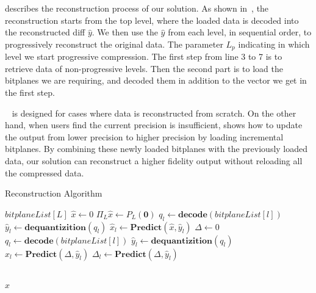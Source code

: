  describes the reconstruction process of our solution. 
As shown in~, the reconstruction starts from the top level, where the loaded data is decoded into the reconstructed diff $\hat{y}$.
We then use the $\hat{y}$ from each level, in sequential order, to progressively reconstruct the original data. 
The parameter $L_p$ indicating in which level we start progressive compression. The first step from line 3 to 7 is to retrieve data of non-progressive levels. Then the second part is to load the bitplanes we are requiring, and decoded them in addition to the vector we get in the first step. 

~ is designed for cases where data is reconstructed from scratch. On the other hand, when users find the current precision is insufficient,  shows how to update the output from lower precision to higher precision by loading incremental bitplanes. 
By combining these newly loaded bitplanes with the previously loaded data, our solution can reconstruct a higher fidelity output without reloading all the compressed data.

\begin{algorithm}
\caption{Reconstruction Algorithm}
\label{alg:reconstruction}
\begin{algorithmic}[1] 
  \Require $bitplaneList[L]$
  \State $\hat x \gets 0$
  \State $\Pi_L \hat x \gets P_L(\mathbf{0})$
      \State $q_l \gets \textbf{decode}(bitplaneList[l])$
      \State $\hat{y}_l \gets \textbf{dequantizition}(q_l)$
      \State $\hat x_l \gets \textbf{Predict}(\hat{x}, \hat y_l)$
  \EndFor
  \State $\Delta \gets 0$
      \State $q_l \gets \textbf{decode}(bitplaneList[l])$
      \State $\hat{y}_l \gets \textbf{dequantizition}(q_l)$
      \State $\hat x_l \gets \textbf{Predict}(\Delta, \hat y_l)$
      \State $\Delta_l \gets \textbf{Predict}(\Delta, \hat y_l)$
      
  \EndFor \\
  \Return $\hat x$
\end{algorithmic}
\end{algorithm}





